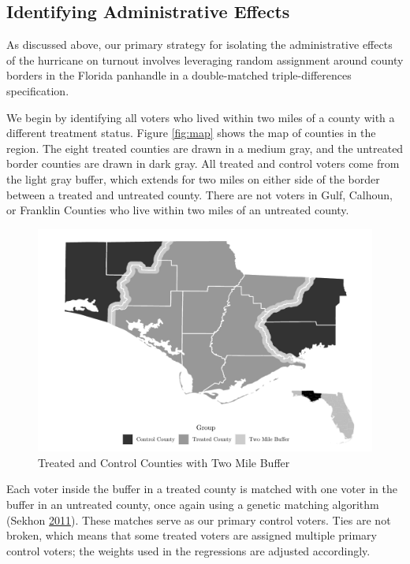 \documentclass[
  12pt,
]{article}
\begin{document}
\hypertarget{identifying-administrative-effects}{%
\subsection*{Identifying Administrative Effects}\label{identifying-administrative-effects}}

As discussed above, our primary strategy for isolating the administrative effects of the hurricane on turnout involves leveraging random assignment around county borders in the Florida panhandle in a double-matched triple-differences specification.

We begin by identifying all voters who lived within two miles of a county with a different treatment status. Figure \ref{fig:map} shows the map of counties in the region. The eight treated counties are drawn in a medium gray, and the untreated border counties are drawn in dark gray. All treated and control voters come from the light gray buffer, which extends for two miles on either side of the border between a treated and untreated county. There are not voters in Gulf, Calhoun, or Franklin Counties who live within two miles of an untreated county.

\begin{figure}[H]

{\centering \includegraphics{hurricane_michael_files/figure-latex/map-chunk-1} 

}

\caption{\label{fig:map}Treated and Control Counties with Two Mile Buffer}\label{fig:map-chunk}
\end{figure}

Each voter inside the buffer in a treated county is matched with one voter in the buffer in an untreated county, once again using a genetic matching algorithm (Sekhon \protect\hyperlink{ref-Sekhon2011}{2011}). These matches serve as our primary control voters. Ties are not broken, which means that some treated voters are assigned multiple primary control voters; the weights used in the regressions are adjusted accordingly.
\end{document}
